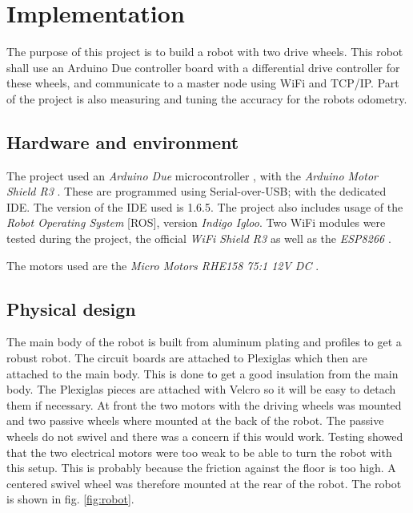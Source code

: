 \documentclass[11pt]{article}
\begin{document}
\section{Implementation}
The purpose of this project is to build a robot with two drive wheels. This
robot shall use an Arduino Due controller board with a differential drive
controller for these wheels, and communicate to a master node using WiFi and
TCP/IP. Part of the project is also measuring and tuning the accuracy for the
robots odometry.\par


\subsection{Hardware and environment}
The project used an \emph{Arduino Due} microcontroller \cite{arduinodue}, with
the \emph{Arduino Motor Shield R3} \cite{motorshield}. These are programmed
using Serial-over-USB; with the dedicated IDE. The version of the IDE used is
1.6.5. The project also includes usage of the \emph{Robot Operating System}
[ROS], version \emph{Indigo Igloo}. Two WiFi modules were tested during the
project, the official \emph{WiFi Shield R3} \cite{wifishield} as well as the
\emph{ESP8266} \cite{ESP8266}. \par

The motors used are the \emph{Micro Motors RHE158 75:1 12V DC} \cite{motors}.

\subsection{Physical design}
The main body of the robot is built from aluminum plating and profiles to get a
robust robot. The circuit boards are attached to Plexiglas which then are
attached to the main body. This is done to get a good insulation from the main
body. The Plexiglas pieces are attached with Velcro so it will be easy to detach
them if necessary. At front the two motors with the driving wheels was mounted
and two passive wheels where mounted at the back of the robot. The passive
wheels do not swivel and there was a concern if this would work. Testing showed
that the two electrical motors were too weak to be able to turn the robot with
this setup. This is probably because the friction against the floor is too
high. A centered swivel wheel was therefore mounted at the rear of the
robot. The robot is shown in fig. \vref{fig:robot}. \par
\end{document}
